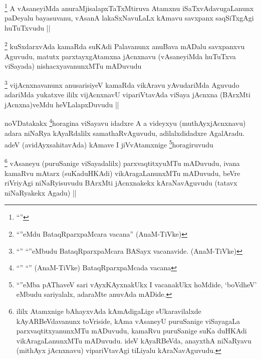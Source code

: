 \begin{artha}
\footnote{``\stext''}
A vAsaneyiMda anuraMjisalapxTaTxMtiruva Atamxnu iSaTxvAdavugaLanunx paDeyalu bayasuvanu, vAsanA lakaSxNavuLaLx kAmavu savxpanx saqSiTxgAgi huTuTxvudu ||
\end{artha}


\begin{artha}
\footnote{``\stext''eMdu BataqRparxpaMcara vacana'' (AnaM-TiVke)}
kuSxdarxvAda kamaRda suKAdi Palavanunx anuBava mADalu savxpanxvu Aguvudu, matutx parxtayxgAtamxna jAcnxnavu (vAsaneyiMda huTuTxva viSayada) nishacxyavanunxMTu mADuvudu
\end{artha}


\begin{artha}
\footnote{``\stext'' ``\stext''eMbudu BataqRparxpaMcara BASayx vacanavide. (AnaM-TiVke)}
vijAcnxnavanunx anusarisiyeV kamaRda vikAravu yAvudariMda Aguvudo adariMda yukatxve ililx vijAcnxnavU vipariVtavAda viSaya jAcnxna (BArxMti jAcnxna)veMdu heVLalapxDuvudu ||
\end{artha}

\begin{artha}
noVDatakakx \footnote{``\stext'' ``\stext'' (AnaM-TiVke) BataqRparxpaMcada vacana}horagina viSayavu idadxre A a videyxyu (muthAyxjAcnxnavu) adara niNaRya kAyaRdalilx samathaRvAguvudu, adilalxdidadxre AgalAradu. adeV (avidAyxsahitavAda) kAmave I jiVvAtamxnige \footnote{``\stext''eMba pAThaveV sari vAyxKAyxnakUkx I vacanakUkx hoMdide, `boVdheV' eMbudu sariyalalx, adaraMte anuvAda mADide.}horagiruvudu
\end{artha}

\begin{artha}
\footnote{ililx Atamxnige bAhayxvAda kAmAdigaLige sUkaravilalxde kAyARBeVdavanunx toVriside, kAma vAsaneyU puruSanige viSayagaLa parxvaqtitxyanunxMTu mADuvudu, kamaRvu puruSanige suKa duHKAdi vikAragaLanunxMTu mADuvudu. ideV kAyaRBeVda, anayxthA niNaRyavu (mithAyx jAcnxnavu) vipariVtavAgi tiLiyalu kAraNavAguvudu.}
vAsaneyu (puruSanige viSayadalilx) parxvaqtitxyuMTu mADuvudu, ivana kamaRvu mAtarx (suKaduHKAdi) vikAragaLanunxMTu mADuvudu, beVre riVriyAgi niNaRyisuvudu BArxMti jAcnxnakekx kAraNavAguvudu (tatavx niNaRyakekx Agadu) ||
\end{artha}

